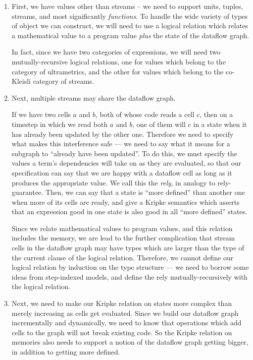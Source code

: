 \documentclass[preprint]{sigplanconf}
\begin{document}
\begin{enumerate}

\item First, we have values other than streams -- we need to support
  units, tuples, streams, and most significantly \emph{functions}.
  To handle the wide variety of types of object we can construct, we
  will need to use a logical relation which relates a mathematical
  value to a program value \emph{plus} the state of the dataflow 
  graph. 

  In fact, since we have two categories of expressions, we will need
  two mutually-recursive logical relations, one for values which
  belong to the category of ultrametrics, and the other for values
  which belong to the co-Kleisli category of streams.

\item Next, multiple streams may share the dataflow graph.

  If we have two cells $a$ and $b$, both of whose code reads a cell
  $c$, then on a timestep in which we read both $a$ and $b$, one of
  them will $c$ in a state when it has already been updated by the
  other one. Therefore we need to specify what makes this interference
  safe --- we need to say what it means for a subgraph to ``already
  have been updated''. To do this, we must specify the values a term's
  dependencies will take on as they are evaluated, so that our
  specification can say that we are happy with a dataflow cell as long
  as it produces the appropriate value. We call this the \emph{rely},
  in analogy to rely-guarantee. Then, we can say that a state is
  ``more defined'' than another one when more of its cells are ready,
  and give a Kripke semantics which asserts that an expression good in
  one state is also good in all ``more defined'' states.

  Since we relate mathematical values to program values, and this
  relation includes the memory, we are lead to the further
  complication that stream cells in the dataflow graph may have types
  which are larger than the type of the current clause of the logical
  relation. Therefore, we cannot define our logical relation by
  induction on the type structure --- we need to borrow some ideas
  from step-indexed models, and define the rely mutually-recursively
  with the logical relation.

\item Next, we need to make our Kripke relation on states more complex
  than merely increasing as cells get evaluated. Since we build our
  dataflow graph incrementally and dynamically, we need to know that
  operations which add cells to the graph will not break existing
  code. So the Kripke relation on memories also needs to support a
  notion of the dataflow graph getting bigger, in addition to getting
  more defined.


\end{enumerate}
\end{document}
